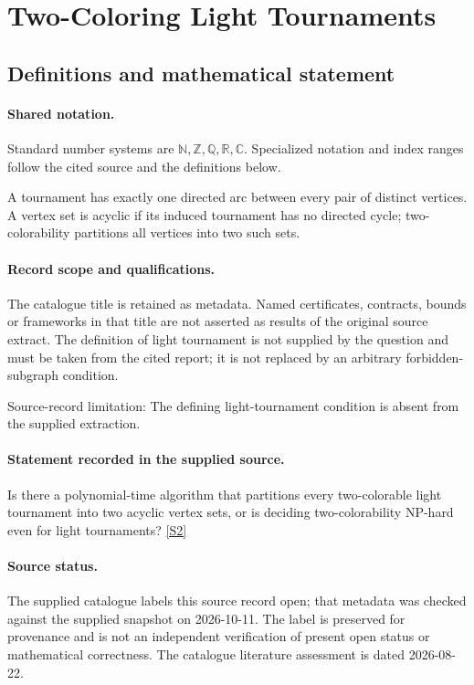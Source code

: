 \documentclass[11pt]{article}
\newcommand{\sref}[2]{\hyperlink{source:#1:#2}{[S#2]}}
\begin{document}
\section{Two-Coloring Light Tournaments}\label{statement}

\subsection{Definitions and mathematical statement}

\paragraph{Shared notation.}Standard number systems are $\mathbb N,\mathbb Z,\mathbb Q,\mathbb R,\mathbb C$. Specialized notation and index ranges follow the cited source and the definitions below.


A tournament has exactly one directed arc between every pair of distinct vertices. A vertex set is acyclic if its induced tournament has no directed cycle; two-colorability partitions all vertices into two such sets.
\paragraph{Record scope and qualifications.}
The catalogue title is retained as metadata. Named certificates, contracts, bounds or frameworks in that title are not asserted as results of the original source extract.
The definition of light tournament is not supplied by the question and must be taken from the cited report; it is not replaced by an arbitrary forbidden-subgraph condition.

Source-record limitation: The defining light-tournament condition is absent from the supplied extraction.
\paragraph{Statement recorded in the supplied source.}
Is there a polynomial-time algorithm that partitions every two-colorable light tournament into two acyclic vertex sets, or is deciding two-colorability NP-hard even for light tournaments? \sref{statement}{2}
\paragraph{Source status.}
The supplied catalogue labels this source record open; that metadata was checked against the supplied snapshot on 2026-10-11. The label is preserved for provenance and is not an independent verification of present open status or mathematical correctness. The catalogue literature assessment is dated 2026-08-22.
\end{document}
